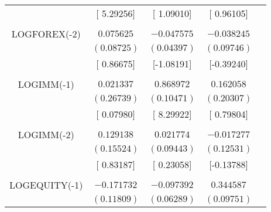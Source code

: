 \begin{tabular}{lrrrr}
\multicolumn{1}{c}{}&\multicolumn{1}{c}{[ 5.29256]}&\multicolumn{1}{c}{[ 1.09010]}&\multicolumn{1}{c}{[ 0.96105]}&\multicolumn{1}{c}{}\\
\multicolumn{1}{c}{}&\multicolumn{1}{c}{}&\multicolumn{1}{c}{}&\multicolumn{1}{c}{}&\multicolumn{1}{c}{}\\
\multicolumn{1}{c}{LOGFOREX(-2)}&\multicolumn{1}{c}{$0.075625$}&\multicolumn{1}{c}{$-0.047575$}&\multicolumn{1}{c}{$-0.038245$}&\multicolumn{1}{c}{}\\
\multicolumn{1}{c}{}&\multicolumn{1}{c}{$(0.08725)$}&\multicolumn{1}{c}{$(0.04397)$}&\multicolumn{1}{c}{$(0.09746)$}&\multicolumn{1}{c}{}\\
\multicolumn{1}{c}{}&\multicolumn{1}{c}{[ 0.86675]}&\multicolumn{1}{c}{[-1.08191]}&\multicolumn{1}{c}{[-0.39240]}&\multicolumn{1}{c}{}\\
\multicolumn{1}{c}{}&\multicolumn{1}{c}{}&\multicolumn{1}{c}{}&\multicolumn{1}{c}{}&\multicolumn{1}{c}{}\\
\multicolumn{1}{c}{LOGIMM(-1)}&\multicolumn{1}{c}{$0.021337$}&\multicolumn{1}{c}{$0.868972$}&\multicolumn{1}{c}{$0.162058$}&\multicolumn{1}{c}{}\\
\multicolumn{1}{c}{}&\multicolumn{1}{c}{$(0.26739)$}&\multicolumn{1}{c}{$(0.10471)$}&\multicolumn{1}{c}{$(0.20307)$}&\multicolumn{1}{c}{}\\
\multicolumn{1}{c}{}&\multicolumn{1}{c}{[ 0.07980]}&\multicolumn{1}{c}{[ 8.29922]}&\multicolumn{1}{c}{[ 0.79804]}&\multicolumn{1}{c}{}\\
\multicolumn{1}{c}{}&\multicolumn{1}{c}{}&\multicolumn{1}{c}{}&\multicolumn{1}{c}{}&\multicolumn{1}{c}{}\\
\multicolumn{1}{c}{LOGIMM(-2)}&\multicolumn{1}{c}{$0.129138$}&\multicolumn{1}{c}{$0.021774$}&\multicolumn{1}{c}{$-0.017277$}&\multicolumn{1}{c}{}\\
\multicolumn{1}{c}{}&\multicolumn{1}{c}{$(0.15524)$}&\multicolumn{1}{c}{$(0.09443)$}&\multicolumn{1}{c}{$(0.12531)$}&\multicolumn{1}{c}{}\\
\multicolumn{1}{c}{}&\multicolumn{1}{c}{[ 0.83187]}&\multicolumn{1}{c}{[ 0.23058]}&\multicolumn{1}{c}{[-0.13788]}&\multicolumn{1}{c}{}\\
\multicolumn{1}{c}{}&\multicolumn{1}{c}{}&\multicolumn{1}{c}{}&\multicolumn{1}{c}{}&\multicolumn{1}{c}{}\\
\multicolumn{1}{c}{LOGEQUITY(-1)}&\multicolumn{1}{c}{$-0.171732$}&\multicolumn{1}{c}{$-0.097392$}&\multicolumn{1}{c}{$0.344587$}&\multicolumn{1}{c}{}\\
\multicolumn{1}{c}{}&\multicolumn{1}{c}{$(0.11809)$}&\multicolumn{1}{c}{$(0.06289)$}&\multicolumn{1}{c}{$(0.09751)$}&\multicolumn{1}{c}{}\\

\end{tabular}
